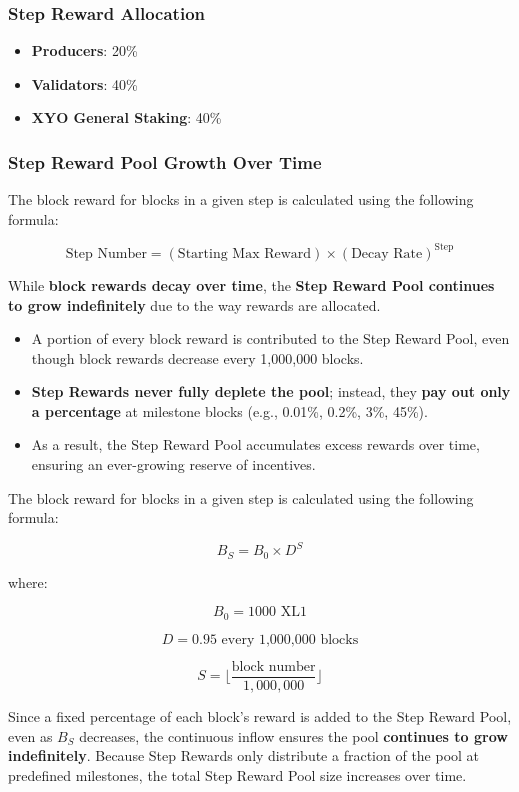 \documentclass{article}
\begin{document}
\subsubsection{Step Reward Allocation}
\begin{itemize}
    \item \textbf{Producers}: 20\%
    \item \textbf{Validators}: 40\%
    \item \textbf{XYO General Staking}: 40\%
\end{itemize}

\subsubsection{Step Reward Pool Growth Over Time}
The block reward for blocks in a given step is calculated using the following
formula:

\[
    \text{Step Number} = (\text{Starting Max Reward}) \times (\text{Decay Rate})^{\text{Step}}
\]

While \textbf{block rewards decay over time}, the \textbf{Step Reward Pool
    continues to grow indefinitely} due to the way rewards are allocated.

\begin{itemize}
    \item A portion of every block reward is contributed to the Step Reward Pool, even
          though block rewards decrease every 1,000,000 blocks.
    \item \textbf{Step Rewards never fully deplete the pool}; instead, they \textbf{pay out only a percentage} at milestone blocks (e.g., 0.01\%, 0.2\%, 3\%, 45\%).
    \item As a result, the Step Reward Pool accumulates excess rewards over time,
          ensuring an ever-growing reserve of incentives.
\end{itemize}

The block reward for blocks in a given step is calculated using the following
formula:

\[
    B_S = B_0 \times D^S
\]

where:

\[
    B_0 = 1000 \text{ XL1}
\]

\[
    D = 0.95 \text{ every 1,000,000 blocks}
\]

\[
    S = \lfloor \frac{\text{block number}}{1,000,000} \rfloor
\]

Since a fixed percentage of each block’s reward is added to the Step Reward
Pool, even as \( B_S \) decreases, the continuous inflow ensures the pool
\textbf{continues to grow indefinitely}. Because Step Rewards only distribute a
fraction of the pool at predefined milestones, the total Step Reward Pool size
increases over time.
\end{document}
